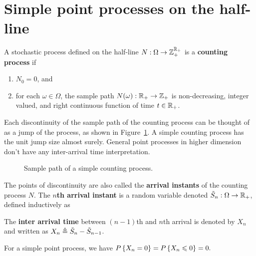 \documentclass[letterpaper,10pt,english]{article}
\begin{document}
\section{Simple point processes on the half-line} 
A stochastic process defined on the half-line $N: \Omega \to \mathbb{Z}_+^{\mathbb{R}_+}$ is a \textbf{counting process} if
\begin{enumerate}
  \item $N_0 = 0$, and 
  \item for each $\omega \in \Omega$, the sample path $N(\omega): \mathbb{R}_+ \to \mathbb{Z}_+$ is non-decreasing, integer valued, and right continuous function of time $t \in \mathbb{R}_+$.%
\end{enumerate}
Each discontinuity of the sample path of the counting process can be thought of as a jump of the process, as shown in Figure~\ref{Fig:Poisson}.  
A simple counting process has the unit jump size almost surely. 
General point processes in higher dimension don't have any inter-arrival time interpretation. 
\begin{figure}[hhhh]
\center
\scalebox{0.8}{}
\caption{Sample path of a simple counting process.}
\label{Fig:Poisson}
\end{figure}
\begin{defn} 
The points of discontinuity are also called the \textbf{arrival instants} of the counting process $N$. 
The \textbf{$n$th arrival instant} is a random variable denoted $\tilde{S}_n: \Omega \to \mathbb{R}_+$, 
defined inductively as 
\end{defn}
\begin{defn} 
The \textbf{inter arrival time} between $(n-1)${th} and $n${th} arrival is denoted by $X_n$ and written as
$X_n \triangleq \tilde{S}_n - \tilde{S}_{n-1}$. 
\end{defn}
\begin{rem} 
For a simple point process, we have
$P\left\{X_{n} = 0\right\} = P\left\{X_n\leqslant 0\right\} = 0.$
\end{rem}
\end{document}
